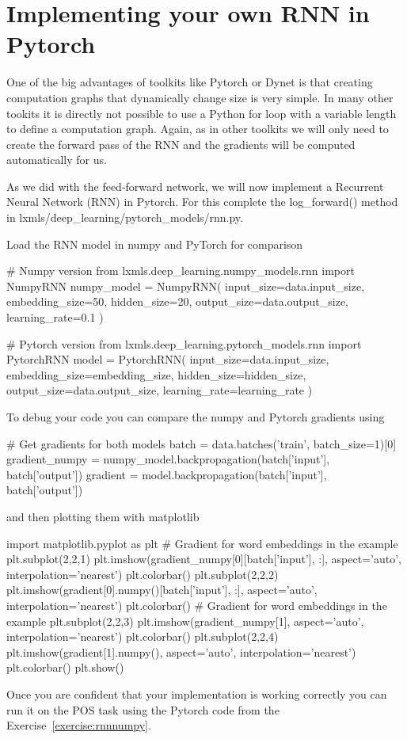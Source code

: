 \clearpage
\section{Implementing your own RNN in Pytorch}

One of the big advantages of toolkits like Pytorch or Dynet is that creating computation graphs that dynamically change size is very simple. In many other tookits it is directly not possible to use a Python for loop with a variable length to define a computation graph. Again, as in other toolkits we will only need to create the forward pass of the RNN and the gradients will be computed automatically for us.

\begin{exercise}
As we did with the feed-forward network, we will now implement a
Recurrent Neural Network (RNN) in Pytorch. For this complete the
log\_forward() method in lxmls/deep\_learning/pytorch\_models/rnn.py.

\noindent Load the RNN model in numpy and PyTorch for comparison
\begin{python}
# Numpy version
from lxmls.deep_learning.numpy_models.rnn import NumpyRNN
numpy_model = NumpyRNN(
    input_size=data.input_size,
    embedding_size=50,
    hidden_size=20,
    output_size=data.output_size,
    learning_rate=0.1
)

# Pytorch version
from lxmls.deep_learning.pytorch_models.rnn import PytorchRNN
model = PytorchRNN(
    input_size=data.input_size,
    embedding_size=embedding_size,
    hidden_size=hidden_size,
    output_size=data.output_size,
    learning_rate=learning_rate
)
\end{python}
\noindent To debug your code you can compare the numpy and Pytorch gradients using
\begin{python}
# Get gradients for both models
batch = data.batches('train', batch_size=1)[0]
gradient_numpy = numpy_model.backpropagation(batch['input'], batch['output'])
gradient = model.backpropagation(batch['input'], batch['output'])
\end{python}
\noindent and then plotting them with matplotlib
\begin{python}
import matplotlib.pyplot as plt
# Gradient for  word embeddings in the example
plt.subplot(2,2,1)
plt.imshow(gradient_numpy[0][batch['input'], :], aspect='auto', interpolation='nearest')
plt.colorbar()
plt.subplot(2,2,2)
plt.imshow(gradient[0].numpy()[batch['input'], :], aspect='auto', interpolation='nearest')
plt.colorbar()
# Gradient for  word embeddings in the example
plt.subplot(2,2,3)
plt.imshow(gradient_numpy[1], aspect='auto', interpolation='nearest')
plt.colorbar()
plt.subplot(2,2,4)
plt.imshow(gradient[1].numpy(), aspect='auto', interpolation='nearest')
plt.colorbar()
plt.show()
\end{python}
Once you are confident that your implementation is working correctly you can run it on the POS task using the Pytorch code from the Exercise~\ref{exercise:rnnnumpy}. 
\end{exercise}

